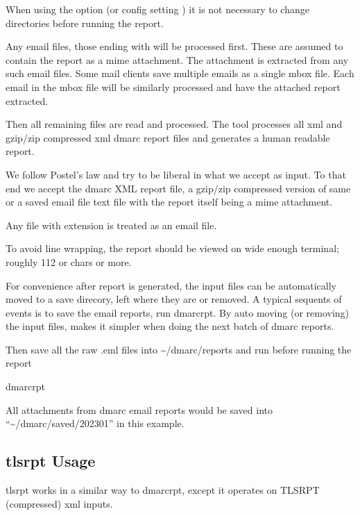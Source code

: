 \documentclass[letterpaper,10pt,english]{sphinxmanual}
\begin{document}
\sphinxAtStartPar
When using the  option (or config setting ) it is not necessary
to change directories before running the report.

\sphinxAtStartPar
Any email files, those ending with  will be processed first. These are assumed to
contain the report as a mime attachment. The attachment is extracted from any such email
files. Some mail clients save multiple emails as a single mbox file. Each email in the mbox
file will be similarly processed and have the attached report extracted.

\sphinxAtStartPar
Then all remaining files are read and processed. The tool processes all xml
and gzip/zip compressed xml dmarc report files and generates a human readable report.

\sphinxAtStartPar
We follow Postel’s law and try to be liberal in what we accept as input. To that end
we accept the dmarc XML report file, a gzip/zip compressed version of same or a saved email
file text file with the report itself being a mime attachment.

\sphinxAtStartPar
Any file with extension  is treated as an email file.

\sphinxAtStartPar
To avoid line wrapping, the report should be viewed on wide enough terminal; roughly 112 or chars or more.

\sphinxAtStartPar
For convenience after report is generated, the input files can be automatically moved to a save
direcory, left where they are or removed. A typical sequents of events is to save
the email reports, run dmarc\sphinxhyphen{}rpt.  By auto moving (or removing) the input files, makes it simpler
when doing the next batch of dmarc reports.

\sphinxAtStartPar
Then save all the raw .eml files into \textasciitilde{}/dmarc/reports and run before running the report

\begin{sphinxVerbatim}[commandchars=\\\{\}]
dmarc\PYGZhy{}rpt
\end{sphinxVerbatim}

\sphinxAtStartPar
All attachments from dmarc email reports would be saved into “\textasciitilde{}/dmarc/saved/2023\sphinxhyphen{}01”
in this example.


\subsection{tls\sphinxhyphen{}rpt Usage}
\label{\detokenize{README:tls-rpt-usage}}
\sphinxAtStartPar
tls\sphinxhyphen{}rpt works in a similar way to dmarc\sphinxhyphen{}rpt, except it operates on TLS\sphinxhyphen{}RPT (compressed) xml inputs.
\end{document}
